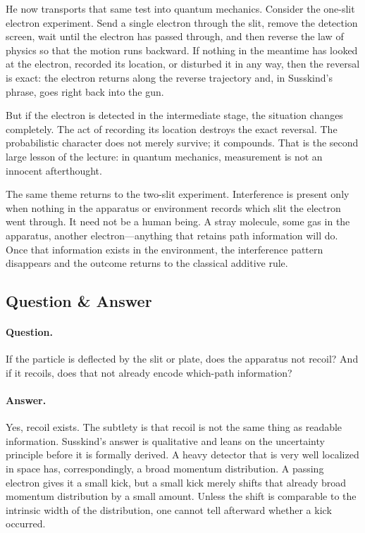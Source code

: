 He now transports that same test into quantum mechanics. Consider the one-slit electron experiment. Send a single electron through the slit, remove the detection screen, wait until the electron has passed through, and then reverse the law of physics so that the motion runs backward. If nothing in the meantime has looked at the electron, recorded its location, or disturbed it in any way, then the reversal is exact: the electron returns along the reverse trajectory and, in Susskind's phrase, goes right back into the gun.

But if the electron is detected in the intermediate stage, the situation changes completely. The act of recording its location destroys the exact reversal. The probabilistic character does not merely survive; it compounds. That is the second large lesson of the lecture: in quantum mechanics, measurement is not an innocent afterthought.

The same theme returns to the two-slit experiment. Interference is present only when nothing in the apparatus or environment records which slit the electron went through. It need not be a human being. A stray molecule, some gas in the apparatus, another electron---anything that retains path information will do. Once that information exists in the environment, the interference pattern disappears and the outcome returns to the classical additive rule.

\subsection{Question \& Answer}

\paragraph{Question.} If the particle is deflected by the slit or plate, does the apparatus not recoil? And if it recoils, does that not already encode which-path information?

\paragraph{Answer.} Yes, recoil exists. The subtlety is that recoil is not the same thing as readable information. Susskind's answer is qualitative and leans on the uncertainty principle before it is formally derived. A heavy detector that is very well localized in space has, correspondingly, a broad momentum distribution. A passing electron gives it a small kick, but a small kick merely shifts that already broad momentum distribution by a small amount. Unless the shift is comparable to the intrinsic width of the distribution, one cannot tell afterward whether a kick occurred.

